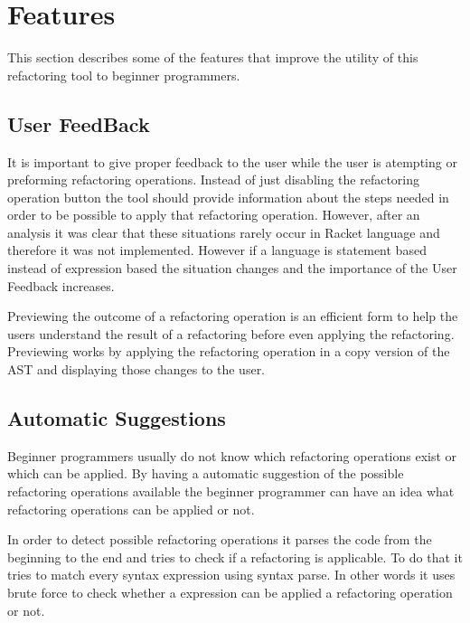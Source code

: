 \section{Features}
This section describes some of the features that improve the utility of this
refactoring tool to beginner programmers. %
\subsection{User FeedBack}
It is important to give proper feedback to the user while the user is atempting or
 preforming refactoring operations.
Instead of just disabling the refactoring operation button the tool should
 provide information about the steps needed in order to be possible to apply
 that refactoring operation.
However, after an analysis it was clear that these situations rarely occur
in Racket language and therefore it was not implemented.
However if a language is statement based instead of expression based the situation changes
and the importance of the User Feedback increases. %

Previewing the outcome of a refactoring operation is an efficient form to
help the users understand the result of a refactoring before even applying the refactoring. %
Previewing works by applying the refactoring operation in a copy version of the AST
and displaying those changes to the user.


\subsection{Automatic Suggestions}
Beginner programmers usually do not know which refactoring operations exist or
which can be applied.
By having a automatic suggestion of the possible refactoring operations available
 the beginner programmer can have an idea what refactoring operations can be
 applied or not.

In order to detect possible refactoring operations it parses the code from the
beginning to the end and tries to check if a refactoring is applicable.
To do that it tries to match every syntax expression using syntax parse.
In other words it uses brute force to check whether a expression can be applied
a refactoring operation or not.

